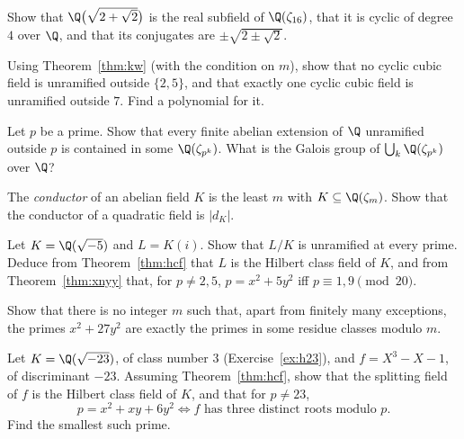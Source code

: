 \begin{exercise}[$\star$]\label{ex:sqrt2plus}
Show that $\Q\bigl(\sqrt{2+\sqrt2}\bigr)$ is the real subfield of $\Q(\zeta_{16})$, that it is cyclic of degree $4$ over $\Q$, and that its conjugates are
$\pm\sqrt{2\pm\sqrt2}$.
\end{exercise}

\begin{exercise}[$\star$]\label{ex:nocubic}
Using Theorem~\ref{thm:kw} (with the condition on $m$), show that no cyclic cubic field is unramified outside $\{2,5\}$, and that exactly one cyclic cubic field
is unramified outside $7$. Find a polynomial for it.
\end{exercise}

\begin{exercise}[$\star$]\label{ex:maxabp}
Let $p$ be a prime. Show that every finite abelian extension of $\Q$ unramified outside $p$ is contained in some $\Q(\zeta_{p^k})$. What is the Galois
group of $\bigcup_k\Q(\zeta_{p^k})$ over $\Q$?
\end{exercise}

\begin{exercise}[$\star\star$]\label{ex:quadcond}
The \emph{conductor} of an abelian field $K$ is the least $m$ with $K\subseteq\Q(\zeta_m)$. Show that the conductor of a quadratic field is $|d_K|$.
\end{exercise}

\begin{exercise}[$\star\star$]\label{ex:hcf5}
Let $K=\Q(\sqrt{-5})$ and $L=K(i)$. Show that $L/K$ is unramified at every prime. Deduce from Theorem~\ref{thm:hcf} that $L$ is the Hilbert class field
of $K$, and from Theorem~\ref{thm:xnyy} that, for $p\ne2,5$, $p=x^2+5y^2$ iff $p\equiv1,9\pmod{20}$.
\end{exercise}

\begin{exercise}[$\star\star$]\label{ex:nocongruence}
Show that there is no integer $m$ such that, apart from finitely many exceptions, the primes $x^2+27y^2$ are exactly the primes in some residue classes
modulo $m$.
\end{exercise}

\begin{exercise}[$\star\star\star$]\label{ex:h23cft}
Let $K=\Q(\sqrt{-23})$, of class number $3$ (Exercise~\ref{ex:h23}), and $f=X^3-X-1$, of discriminant $-23$. Assuming Theorem~\ref{thm:hcf}, show that the
splitting field of $f$ is the Hilbert class field of $K$, and that for $p\ne23$,
\[
p=x^2+xy+6y^2\iff f\text{ has three distinct roots modulo }p.
\]
Find the smallest such prime.
\end{exercise}

